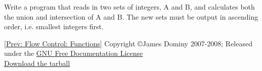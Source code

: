 \documentclass[a4paper,11pt]{article}
\begin{document}
Write a program that reads in two sets of integers, A and B, and calculates both the union and intersection of A and B. The new sets must be output in ascending order, i.e. smallest integers first.

    [\href{functions.html}{Prev: Flow Control: Functions}]\nolinebreak 
   Copyright \copyright James Dominy 2007-2008; Released under the \href{http://www.gnu.org/copyleft/fdl.html}{GNU Free Documentation License}
\\\href{intropython.tar.gz}{Download the tarball}
\end{document}
